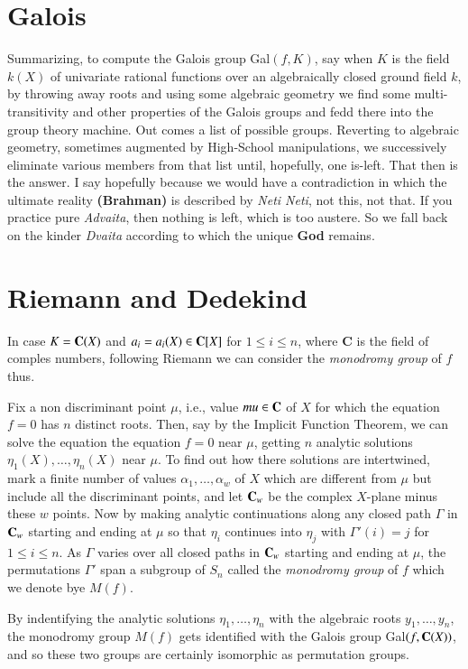 \section{Galois} 

Summarizing, to compute the Galois group Gal$(f, K)$, say when $K$ is the field $k(X)$ of univariate rational functions over an algebraically closed ground field $k$, by throwing away roots and using some algebraic geometry we find some multi-transitivity and other properties of the Galois groups and fedd there into the group theory machine. Out comes a list of possible groups. Reverting to algebraic geometry, sometimes augmented by High-School manipulations, we successively eliminate various members from that list until, hopefully, one is-left. That then is the answer. I say hopefully because we would have a contradiction in which the ultimate reality {\bf (Brahman)} is described by {\it Neti Neti}, not this, not that. If you practice pure {\it Advaita}, then nothing is left, which is too austere. So we fall back on the kinder {\it Dvaita} according to which the unique {\bf God} remains. 

\section{Riemann and Dedekind}

In case $K=\mathbf{C}(X)$ and $a_{i}=a_{i}(X)\in \mathbf{C}[X]$ for $1\leq i \leq n$, where {\bf C} is the field  of comples numbers, following Riemann \cite{art1-key53} we can consider the {\it monodromy group} of $f$ thus.

Fix a non discriminant point $\mu$, i.e., value $mu \in \mathbf{C}$ of $X$ for which the equation $f=0$ has $n$ distinct roots. Then, say by the Implicit Function Theorem, we can solve the equation the equation $f=0$ near $\mu$, getting $n$ analytic solutions $\eta _{1}(X), \ldots, \eta _{n}(X)$ near $\mu$. To find out how there solutions are intertwined, mark a finite number of values $\alpha_{1}, \ldots, \alpha_{w}$ of $X$ which are different from $\mu$ but include all the discriminant points, and let $\mathbf{C}_{w}$ be the complex $X$-plane minus these $w$ points. Now by making analytic continuations along any closed path $\Gamma$ in $\mathbf{C}_{w}$ starting and ending at $\mu$ so that $\eta_{i}$ continues into $\eta_{j}$ with $\Gamma'(i)= j$ for $1 \leq i \leq n$. As $\Gamma$ varies over all closed paths in $\mathbf{C}_{w}$ starting and ending at $\mu$, the permutations $\Gamma'$ span a subgroup of $S_{n}$ called the {\it monodromy group} of  $f$ which we denote bye $M(f)$.   
 
By indentifying the analytic solutions $\eta_{1}, \ldots, \eta_{n}$ with the algebraic roots $y_{1}, \ldots, y_{n}$, the monodromy group $M(f)$ gets identified with the Galois group Gal$(f, \mathbf{C}(X))$, and so these two groups are certainly isomorphic as permutation groups.
